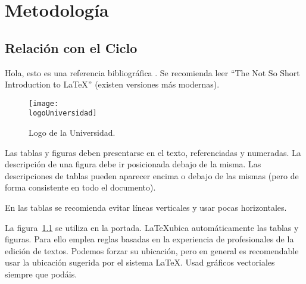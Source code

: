 \documentclass[12pt,twoside,titlepage]{report}
\newcommand{\logoUniversidad}{logoURJC.pdf} %
\begin{document}
\chapter{Metodología}
\label{chap:contenidos}




\section{Relación con el Ciclo}

Hola, esto es una referencia bibliográfica \cite{libro_calculo}. Se recomienda leer ``The Not So Short Introduction to \LaTeX'' \cite{Oetiker2007} (existen versiones más modernas).


\begin{figure}
	\centering
	\texttt{[image: \\logoUniversidad]}
	\caption{Logo de la Universidad.}
	\label{fig:logo_universidad}
\end{figure}

Las tablas y figuras deben presentarse en el texto, referenciadas y numeradas. La descripción de una figura debe ir posicionada debajo de la misma. Las descripciones de tablas pueden aparecer encima o debajo de las mismas (pero de forma consistente en todo el documento).

En las tablas se recomienda evitar líneas verticales y usar pocas horizontales.

La figura~\ref{fig:logo_universidad} se utiliza en la portada. \LaTeX ubica automáticamente las tablas y figuras. Para ello emplea reglas basadas en la experiencia de profesionales de la edición de textos. Podemos forzar su ubicación, pero en general es recomendable usar la ubicación sugerida por el sistema \LaTeX. Usad gráficos vectoriales siempre que podáis.
\end{document}
